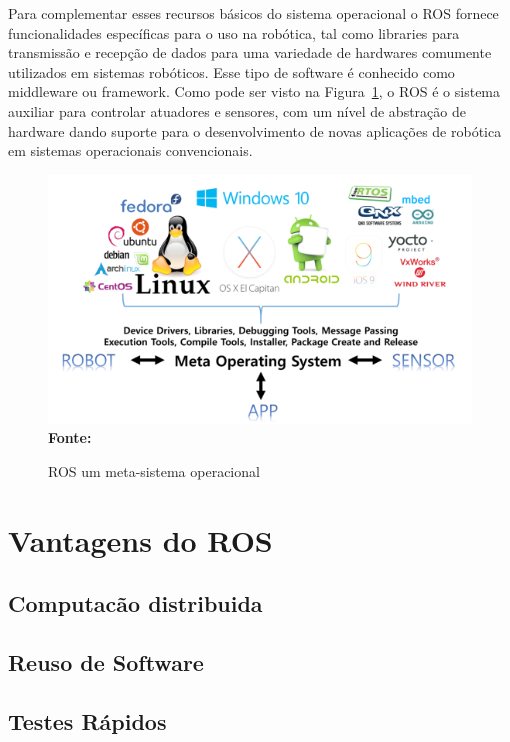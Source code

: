 Para complementar esses recursos básicos do sistema operacional o ROS fornece funcionalidades específicas para o uso na robótica, tal como libraries para transmissão e recepção de dados para uma variedade de hardwares comumente utilizados em sistemas robóticos. Esse tipo de software é conhecido como middleware ou framework. Como pode ser visto na Figura~\ref{fig:rosmeta}, o ROS é o sistema auxiliar para controlar atuadores e sensores, com um nível de abstração de hardware dando suporte para o desenvolvimento de novas aplicações de robótica em sistemas operacionais convencionais.

\begin{figure}[ht]
	\caption{ROS um meta-sistema operacional}
	\begin{center}
		\includegraphics[scale=0.47]{imagens/metaOS.png}\\
		{\small \textbf{Fonte:} }
    \end{center}\label{fig:rosmeta}
\end{figure}



\section{Vantagens do ROS}


\subsection{Computacão distribuida}
\subsection{Reuso de Software}
\subsection{Testes Rápidos}

